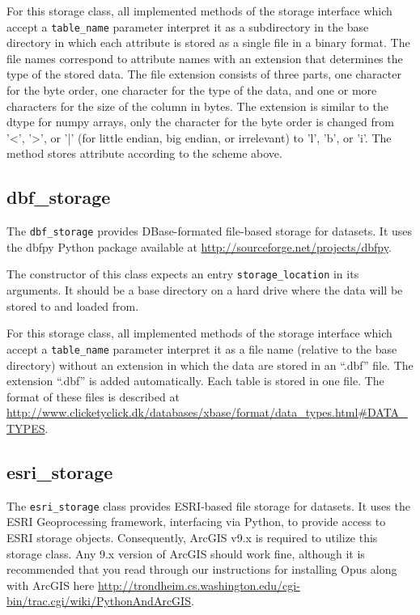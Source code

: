 For this storage class, all implemented methods of the storage interface which
accept a \verb|table_name| parameter interpret it as a subdirectory in the base
directory in which each attribute is stored as a single file in a binary format.
The file names correspond to attribute names with an extension that determines
the type of the stored data. The file extension consists of three parts, one
character for the byte order, one character for the type of the data, and one or
more characters for the size of the column in bytes. The extension is similar to
the dtype for numpy arrays, only the character for the byte order is changed from
'<', '>', or '|' (for little endian, big endian, or irrelevant) to 'l', 'b', or
'i'. The method  stores attribute according to the scheme
above.

\subsection{dbf_storage}
%
The \verb|dbf_storage| provides DBase-formated file-based storage for
datasets.  It uses the dbfpy Python package available at
\url{http://sourceforge.net/projects/dbfpy}.

The constructor of this class expects an entry \verb|storage_location| in its
arguments. It should be a base directory on a hard drive where
the data will be stored to and loaded from.

For this storage class, all implemented methods of the storage interface which
accept a \verb|table_name| parameter interpret it as a file name (relative to the
base directory) without an extension in which the data are stored in an ``.dbf''
file.  The extension ``.dbf'' is added automatically. Each table is stored in one
file. The format of these files is described at
\url{http://www.clicketyclick.dk/databases/xbase/format/data_types.html\#DATA_TYPES}.

\subsection{esri_storage}
%
The \verb|esri_storage| class provides ESRI-based file storage for datasets.  It uses the 
ESRI Geoprocessing framework, interfacing via Python, to provide access to ESRI storage
objects.  Consequently, ArcGIS v9.x is required to utilize this storage class.  Any 9.x version
of ArcGIS should work fine, although it is recommended that you read through our instructions
for installing Opus along with ArcGIS here
\url{http://trondheim.cs.washington.edu/cgi-bin/trac.cgi/wiki/PythonAndArcGIS}.

